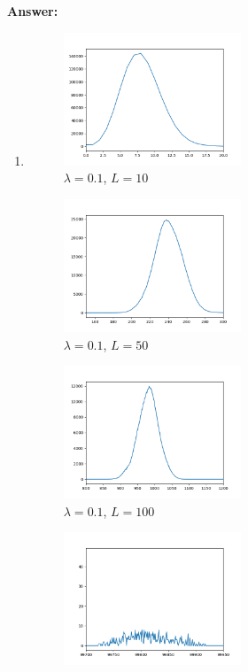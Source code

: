 \documentclass[11pt]{article}
\begin{document}
\textbf{Answer:}
\begin{enumerate}
    \item 
    \begin{figure}
        \centering
        \includegraphics[width=0.5\textwidth]{Figure_1.png}
        \caption{$\lambda = 0.1$, $L = 10$}
    \end{figure}
    \begin{figure}
        \centering
        \includegraphics[width=0.5\textwidth]{Figure_2.png}
        \caption{$\lambda = 0.1$, $L = 50$}
    \end{figure}
    \begin{figure}
        \centering
        \includegraphics[width=0.5\textwidth]{Figure_3.png}
        \caption{$\lambda = 0.1$, $L = 100$}
    \end{figure}
    \begin{figure}
        \centering
        \includegraphics[width=0.5\textwidth]{Figure_4.png}

\end{figure}
\end{enumerate}
\end{document}
